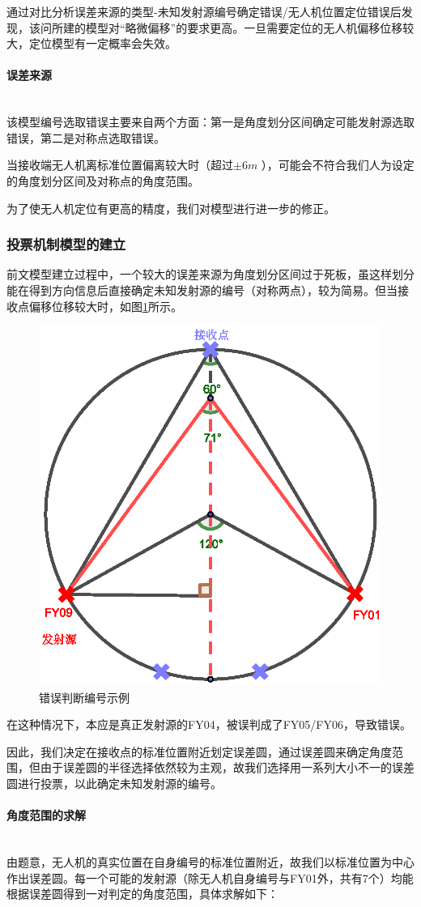 \documentclass{ctexart}
\newcommand{\subsubsubsection}[1]{\paragraph{#1}\mbox{}\\}
\begin{document}
  通过对比分析误差来源的类型-未知发射源编号确定错误/无人机位置定位错误后发现，该问所建的模型对“略微偏移”的要求更高。一旦需要定位的无人机偏移位移较大，定位模型有一定概率会失效。

  \subsubsubsection{误差来源}

  该模型编号选取错误主要来自两个方面：第一是角度划分区间确定可能发射源选取错误，第二是对称点选取错误。

  当接收端无人机离标准位置偏离较大时（超过$\pm 6m$ ），可能会不符合我们人为设定的角度划分区间及对称点的角度范围。

  为了使无人机定位有更高的精度，我们对模型进行进一步的修正。

  \subsubsection{投票机制模型的建立}

  前文模型建立过程中，一个较大的误差来源为角度划分区间过于死板，虽这样划分能在得到方向信息后直接确定未知发射源的编号（对称两点），较为简易。但当接收点偏移位移较大时，如图\ref{错误判断编号示例}所示。
  
  \begin{figure}[H]
    \centering
    \includegraphics[width=0.35\linewidth]{pic/error.eps}
    \caption{错误判断编号示例}
    \label{错误判断编号示例}
    \end{figure}


  在这种情况下，本应是真正发射源的FY04，被误判成了FY05/FY06，导致错误。
  
  因此，我们决定在接收点的标准位置附近划定误差圆，通过误差圆来确定角度范围，但由于误差圆的半径选择依然较为主观，故我们选择用一系列大小不一的误差圆进行投票，以此确定未知发射源的编号。


  \subsubsubsection{角度范围的求解}

  由题意，无人机的真实位置在自身编号的标准位置附近，故我们以标准位置为中心作出误差圆。每一个可能的发射源（除无人机自身编号与FY01外，共有7个）均能根据误差圆得到一对判定的角度范围，具体求解如下：
\end{document}
